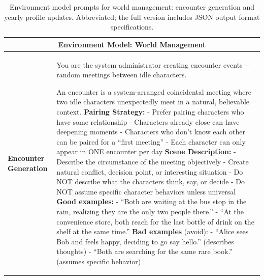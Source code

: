 \begin{table}[h]
\centering
\caption{Environment model prompts for world management: encounter generation and yearly profile updates. Abbreviated; the full version includes JSON output format specifications.}
\label{tab:prompts_god_world}
\begin{tabular}{p{0.8in}p{4.3in}}
\toprule
\multicolumn{2}{c}{\textbf{Environment Model: World Management}} \\
\midrule

\textbf{Encounter \newline Generation} &

You are the system administrator creating encounter events---random meetings between idle characters.

An encounter is a system-arranged coincidental meeting where two idle characters unexpectedly meet in a natural, believable context.
\vspace{4pt}\newline
\textbf{Pairing Strategy:}
\newline - Prefer pairing characters who have some relationship
\newline - Characters already close can have deepening moments
\newline - Characters who don't know each other can be paired for a ``first meeting''
\newline - Each character can only appear in ONE encounter per day
\vspace{4pt}\newline
\textbf{Scene Description:}
\newline - Describe the circumstance of the meeting objectively
\newline - Create natural conflict, decision point, or interesting situation
\newline - Do NOT describe what the characters think, say, or decide
\newline - Do NOT assume specific character behaviors unless universal
\vspace{4pt}\newline
\textbf{Good examples:}
\newline - ``Both are waiting at the bus stop in the rain, realizing they are the only two people there.''
\newline - ``At the convenience store, both reach for the last bottle of drink on the shelf at the same time.''
\vspace{3pt}\newline
\textbf{Bad examples} (avoid):
\newline - ``Alice sees Bob and feels happy, deciding to go say hello.'' (describes thoughts)
\newline - ``Both are searching for the same rare book.'' (assumes specific behavior)


\end{tabular}
\end{table}
